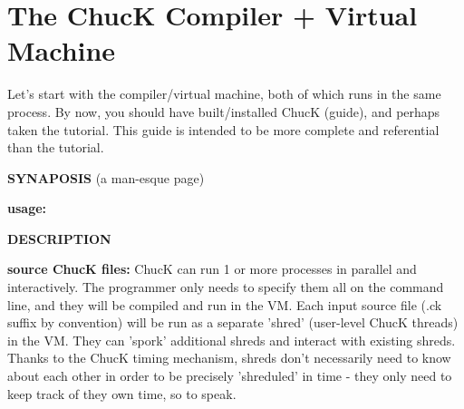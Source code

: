 \chapter{The ChucK Compiler + Virtual Machine}

Let's start with the compiler/virtual machine, both of which runs in the same process. By now, you should have built/installed ChucK (guide), and perhaps taken the tutorial. This guide is intended to be more complete and referential than the tutorial. 

{\bf SYNAPOSIS} (a man-esque page) 

\begin{center}
{\bf usage:}
\end{center}




{\bf DESCRIPTION}

{\bf \myleft source ChucK files\myright:}
ChucK can run 1 or more processes in parallel and interactively. The programmer only needs to specify them all on the command line, and they will be compiled and run in the VM. Each input source file (.ck suffix by convention) will be run as a separate 'shred' (user-level ChucK threads) in the VM. They can 'spork' additional shreds and interact with existing shreds. Thanks to the ChucK timing mechanism, shreds don't necessarily need to know about each other in order to be precisely 'shreduled' in time - they only need to keep track of they own time, so to speak. 

